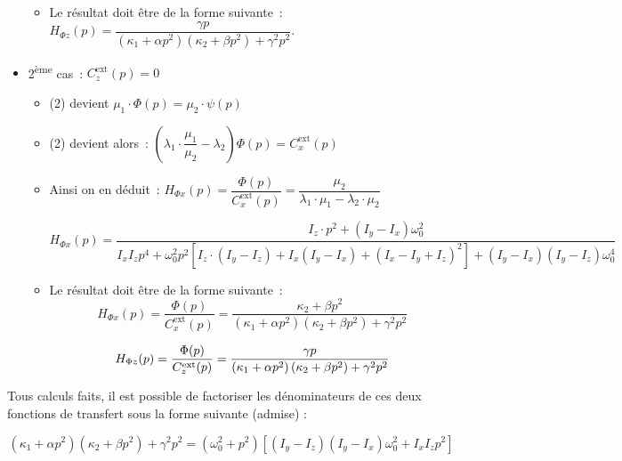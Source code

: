 \begin{corrige}
\begin{itemize}
\begin{itemize}
    \item Le résultat doit être de la forme suivante~:$
H_{\Phi z}(p)=\dfrac{\gamma p}{\left(\kappa_1+\alpha p^2\right)\left(\kappa_2+\beta p^2\right)+\gamma^2p^2}
$.
  
  \end{itemize}
\item 2\textsuperscript{ème} cas~:  $C_z^{\text{ext}}(p)=0$
  \begin{itemize}
  \item (2) devient $\mu_1\cdot \Phi(p)=\mu_2\cdot \psi(p)$
  \item  (2) devient alors~: $\left(\lambda_1\cdot \dfrac{\mu_1}{\mu_2}-\lambda_2\right)\Phi(p)=C_x^{\text{ext}}(p)$
  \item Ainsi on en déduit~: $
H_{\Phi x}(p)=\dfrac{\Phi(p)}{C_x^{\text{ext}}(p)}=\dfrac{\mu_2}{\lambda_1\cdot \mu_1-\lambda_2\cdot \mu_2}
$

$$
H_{\Phi x}(p)=\dfrac{I_z\cdot p^2+\left(I_y-I_x\right)\omega_0^2}{I_xI_zp^4+\omega_0^2 p^2\left[I_z\cdot \left(I_y-I_z\right)+I_x\left(I_y-I_x\right)+\left(I_x-I_y+I_z\right)^2\right]+\left(I_y-I_x\right)\left(I_y-I_z\right)\omega_0^4}
$$
  
  \item Le résultat doit être de la forme suivante~:
  $$
H_{\Phi x}(p)=\dfrac{\Phi(p)}{C_x^{\text{ext}}(p)}=\dfrac{\kappa_2+\beta p^2}{\left(\kappa_1+\alpha p^2\right)\left(\kappa_2+\beta p^2\right)+\gamma^2p^2}$$

$$
H_{\Phi z}(p)=\dfrac{\Phi(p)}{C_z^{\text{ext}}(p)}=\dfrac{\gamma p}{\left(\kappa_1+\alpha p^2\right)\left(\kappa_2+\beta p^2\right)+\gamma^2p^2}\\
$$
  

 \end{itemize}  
  
  \end{itemize}
  

\end{corrige}
\else
\fi

 

Tous calculs faits, il est possible de factoriser les dénominateurs de ces deux fonctions de transfert sous la forme suivante (admise) :
  
$$
\left(\kappa_1+\alpha p^2\right)\left(\kappa_2+\beta p^2\right)+\gamma^2p^2
=\left(\omega_0^2+p^2\right)\left[\left(I_y-I_z\right)\left(I_y-I_x\right)\omega_0^2+I_xI_z p^2\right]
$$
  
